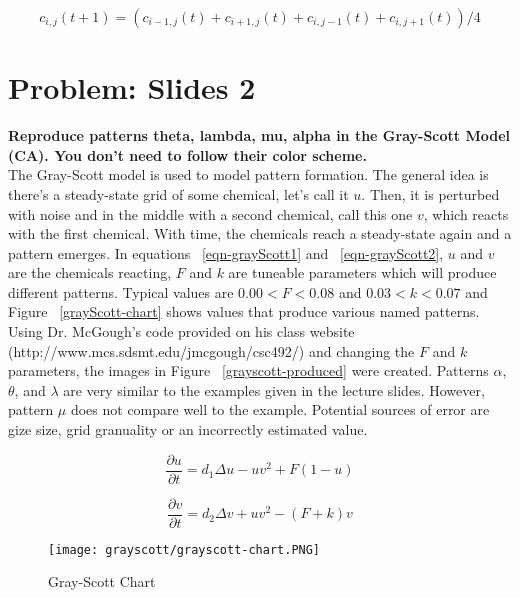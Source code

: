 \begin{equation}
c_{i,j}(t+1) = ( c_{i-1,j}(t) + c_{i+1,j}(t) + c_{i,j-1}(t) + c_{i,j+1}(t)) / 4
\end{equation} \label{heatDiscrete}

\section{Problem: Slides 2}
\textbf{ Reproduce patterns theta, lambda, mu, alpha in the Gray-Scott Model (CA). You don't need to follow their color scheme. } \\
\newline
The Gray-Scott model is used to model pattern formation. The general idea is there's a steady-state grid of some chemical, let's call it $u$. Then, it is perturbed with noise and in the middle with a second chemical, call this one $v$, which reacts with the first chemical. With time, the chemicals reach a steady-state again and a pattern emerges. In equations ~\ref{eqn-grayScott1} and ~\ref{eqn-grayScott2}, $u$ and $v$ are the chemicals reacting, $F$ and $k$ are tuneable parameters which will produce different patterns. Typical values are $ 0.00 < F < 0.08 $ and $ 0.03 < k < 0.07 $ and Figure ~\ref{grayScott-chart} shows values that produce various named patterns.\\

  Using Dr. McGough's code provided on his class website (http://www.mcs.sdsmt.edu/jmcgough/csc492/) and changing the $F$ and $k$ parameters, the images in Figure ~\ref{grayscott-produced} were created. Patterns $\alpha$, $\theta$, and  $\lambda$ are very similar to the examples given in the lecture slides. However, pattern $\mu$ does not compare well to the example. Potential sources of error are gize size, grid granuality or an incorrectly estimated value.

\begin{equation}
\frac{ \partial u}{ \partial t } = d_1  \Delta u - uv^2 + F(1-u)
\end{equation} \label{eqn-grayScott1}

\begin{equation}
\frac{ \partial v}{ \partial t } = d_2 \Delta v + uv^2 - (F+k)v
\end{equation} \label{eqn-grayScott2}

\begin{figure}[tbh]
\begin{center}
\texttt{[image: grayscott/grayscott-chart.PNG]}
\caption{ Gray-Scott Chart }
\end{center}
\end{figure}\label{grayScott-chart}


